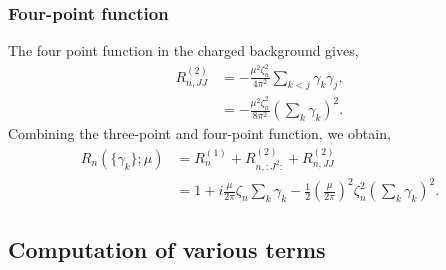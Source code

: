 \documentclass[11pt]{article}
\newcommand{\lb}{\left(}
\newcommand{\rb}{\right)}
\begin{document}
\subsubsection{Four-point function}
The four point function in the charged background gives,
\begin{align}
    R_{n,JJ}^{(2)} &= -\frac{\mu^2\zeta_n^2} {4\pi^2}\sum_{k<j}\gamma_k\gamma_j,\\
    &= -\frac{\mu^2\zeta_n^2}{8\pi^2}\lb\sum_k \gamma_k\rb^2.
\end{align}
Combining the three-point and four-point function, we obtain,
\begin{align}
    R_n(\{\gamma_k\};\mu) &= R_n^{(1)}+ R_{n,:J^2:}^{(2)}+  R_{n,JJ}^{(2)} \\&= 1+ i\frac{\mu}{2\pi}\zeta_n \sum_k\gamma_k - \frac{1}{2}\lb \frac{\mu}{2\pi}\rb^2 \zeta_n^2 \lb\sum_k\gamma_k\rb^2.
\end{align}
\subsection{Computation of various terms}
\end{document}
